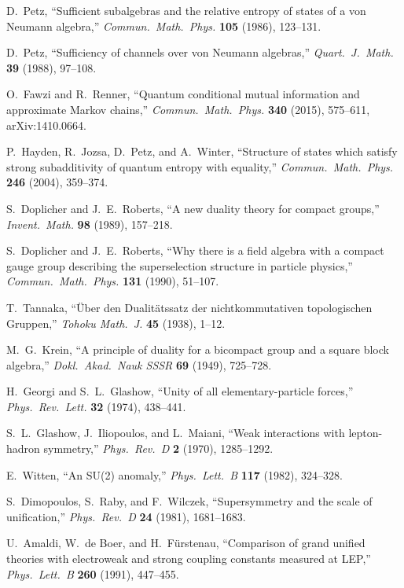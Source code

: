 D.~Petz,
``Sufficient subalgebras and the relative entropy of states of a von Neumann algebra,''
\emph{Commun.\ Math.\ Phys.} \textbf{105} (1986), 123--131.

D.~Petz,
``Sufficiency of channels over von Neumann algebras,''
\emph{Quart.\ J.\ Math.} \textbf{39} (1988), 97--108.

O.~Fawzi and R.~Renner,
``Quantum conditional mutual information and approximate Markov chains,''
\emph{Commun.\ Math.\ Phys.} \textbf{340} (2015), 575--611,
arXiv:1410.0664.

P.~Hayden, R.~Jozsa, D.~Petz, and A.~Winter,
``Structure of states which satisfy strong subadditivity of quantum entropy with equality,''
\emph{Commun.\ Math.\ Phys.} \textbf{246} (2004), 359--374.

S.~Doplicher and J.~E.~Roberts,
``A new duality theory for compact groups,''
\emph{Invent.\ Math.} \textbf{98} (1989), 157--218.

S.~Doplicher and J.~E.~Roberts,
``Why there is a field algebra with a compact gauge group describing the superselection structure in particle physics,''
\emph{Commun.\ Math.\ Phys.} \textbf{131} (1990), 51--107.

T.~Tannaka,
``\"Uber den Dualit\"atssatz der nichtkommutativen topologischen Gruppen,''
\emph{Tohoku Math.\ J.} \textbf{45} (1938), 1--12.

M.~G.~Krein,
``A principle of duality for a bicompact group and a square block algebra,''
\emph{Dokl.\ Akad.\ Nauk SSSR} \textbf{69} (1949), 725--728.

H.~Georgi and S.~L.~Glashow,
``Unity of all elementary-particle forces,''
\emph{Phys.\ Rev.\ Lett.} \textbf{32} (1974), 438--441.

S.~L.~Glashow, J.~Iliopoulos, and L.~Maiani,
``Weak interactions with lepton-hadron symmetry,''
\emph{Phys.\ Rev.\ D} \textbf{2} (1970), 1285--1292.

E.~Witten,
``An SU(2) anomaly,''
\emph{Phys.\ Lett.\ B} \textbf{117} (1982), 324--328.

S.~Dimopoulos, S.~Raby, and F.~Wilczek,
``Supersymmetry and the scale of unification,''
\emph{Phys.\ Rev.\ D} \textbf{24} (1981), 1681--1683.

U.~Amaldi, W.~de Boer, and H.~F\"urstenau,
``Comparison of grand unified theories with electroweak and strong coupling constants measured at LEP,''
\emph{Phys.\ Lett.\ B} \textbf{260} (1991), 447--455.


